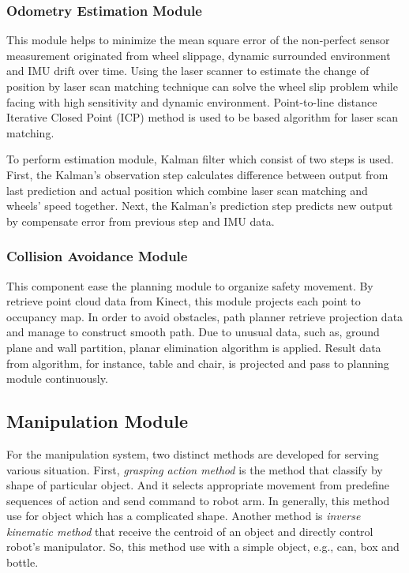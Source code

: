 \documentclass{llncs}
\begin{document}
\subsubsection{Odometry Estimation Module}

This module helps to minimize the mean square error of the non-perfect sensor measurement originated from wheel slippage, dynamic surrounded environment and IMU drift over time. Using the laser scanner to estimate the change of position by laser scan matching technique can solve the wheel slip problem while facing with high sensitivity and dynamic environment. Point-to-line distance Iterative Closed Point (ICP)\cite{icp1}\cite{icp2} method is used to be based algorithm for laser scan matching.

To perform estimation module, Kalman filter which consist of two steps is used. First, the Kalman's observation step calculates difference between output from last prediction and actual position which combine laser scan matching and wheels' speed together. Next, the Kalman's prediction step predicts new output by compensate error from previous step and IMU data.

\subsubsection{Collision Avoidance Module}

This component ease the planning module to organize safety movement. By retrieve point cloud data from Kinect, this module projects each point to occupancy map. In order to avoid obstacles, path planner retrieve projection data and manage to construct smooth path. Due to unusual data, such as, ground plane and wall partition, planar elimination algorithm is applied. Result data from algorithm, for instance, table and chair, is projected and pass to planning module continuously.

\subsection{Manipulation Module}

For the manipulation system, two distinct methods are developed for serving various situation. First, \textit{grasping action method} is the method that classify by shape of particular object. And it selects appropriate movement from predefine sequences of action and send command to robot arm. In generally, this method use for object which has a complicated shape. Another method is \textit{inverse kinematic method} that receive the centroid of an object and directly control robot's manipulator. So, this method use with a simple object, e.g., can, box and bottle.
\end{document}

